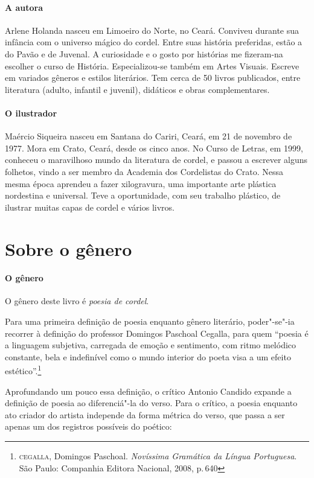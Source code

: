 \documentclass[11pt]{extarticle}
\begin{document}
\paragraph{A autora}
Arlene Holanda nasceu em Limoeiro do Norte, no Ceará. Conviveu durante sua infância com o universo mágico do cordel. Entre suas história preferidas, estão a do Pavão e de
Juvenal. A curiosidade e o gosto por histórias me fizeram-na escolher o curso de História. Especializou-se também em Artes Visuais. Escreve em variados gêneros e estilos literários. Tem cerca de 50 livros publicados, entre literatura (adulto, infantil e juvenil), didáticos e obras complementares.


\paragraph{O ilustrador}
Maércio Siqueira nasceu em Santana do Cariri, Ceará, em 21 de novembro de 1977.
Mora em Crato, Ceará, desde os cinco anos. No Curso de Letras, em 1999, conheceu o
maravilhoso mundo da literatura de cordel, e passou a escrever alguns
folhetos, vindo a ser membro da Academia dos Cordelistas do Crato.
Nessa mesma época aprendeu a fazer xilogravura, uma importante arte
plástica nordestina e universal. Teve a oportunidade, com seu trabalho plástico, de ilustrar muitas capas de cordel e vários livros.



\section{Sobre o gênero}

\paragraph{O gênero} O gênero deste livro é \textit{poesia de cordel}. 


Para uma primeira definição de poesia enquanto gênero literário, poder"-se"-ia recorrer à definição do professor Domingos Paschoal Cegalla, para quem ``poesia é a linguagem subjetiva, carregada de emoção e sentimento, com ritmo melódico constante, bela e indefinível como o mundo interior do poeta visa a um efeito estético''.\footnote{\textsc{cegalla}, Domingos Paschoal. \textit{Novíssima Gramática da Língua Portuguesa}. São Paulo: Companhia Editora Nacional, 2008, p.\,640}

Aprofundando um pouco essa definição, o crítico Antonio Candido expande a definição de poesia ao diferenciá"-la do verso.
Para o crítico, a poesia enquanto ato criador do artista independe da forma métrica do verso, que passa a ser apenas um dos registros possíveis do poético:
\end{document}
